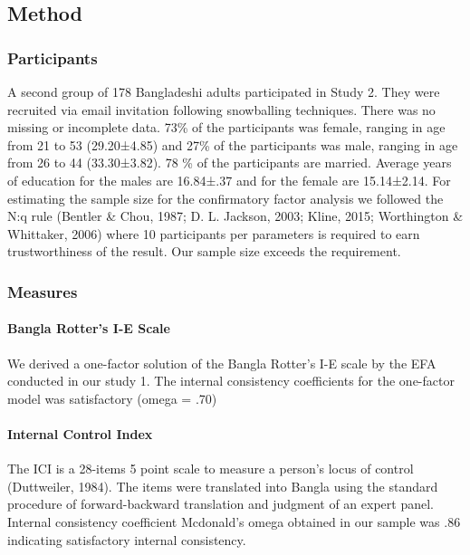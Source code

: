 \documentclass[
  english,
  man]{apa6}
\let\oldparagraph\paragraph
\renewcommand{\paragraph}[1]{\oldparagraph{#1}\mbox{}}
\begin{document}
\hypertarget{method}{%
\subsection{Method}\label{method}}

\hypertarget{participants-1}{%
\subsubsection{Participants}\label{participants-1}}

A second group of 178 Bangladeshi adults participated in Study 2. They were recruited via email invitation following snowballing techniques. There was no missing or incomplete data. 73\% of the participants was female, ranging in age from 21 to 53 (29.20±4.85) and 27\% of the participants was male, ranging in age from 26 to 44 (33.30±3.82). 78 \% of the participants are married. Average years of education for the males are 16.84±.37 and for the female are 15.14±2.14. For estimating the sample size for the confirmatory factor analysis we followed the N:q rule (Bentler \& Chou, 1987; D. L. Jackson, 2003; Kline, 2015; Worthington \& Whittaker, 2006) where 10 participants per parameters is required to earn trustworthiness of the result. Our sample size exceeds the requirement.

\hypertarget{measures}{%
\subsubsection{Measures}\label{measures}}

\hypertarget{bangla-rotters-i-e-scale}{%
\paragraph{Bangla Rotter's I-E Scale}\label{bangla-rotters-i-e-scale}}

We derived a one-factor solution of the Bangla Rotter's I-E scale by the EFA conducted in our study 1. The internal consistency coefficients for the one-factor model was satisfactory (omega = .70)

\hypertarget{internal-control-index}{%
\paragraph{Internal Control Index}\label{internal-control-index}}

The ICI is a 28-items 5 point scale to measure a person's locus of control (Duttweiler, 1984). The items were translated into Bangla using the standard procedure of forward-backward translation and judgment of an expert panel. Internal consistency coefficient Mcdonald's omega obtained in our sample was .86 indicating satisfactory internal consistency.
\end{document}
